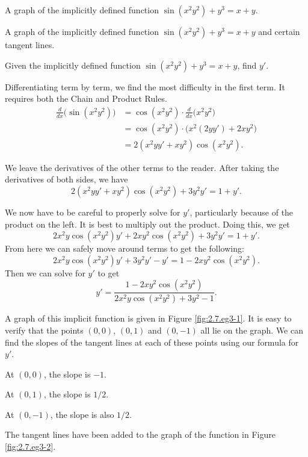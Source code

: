 \begin{marginfigure}[6cm]
\caption{A graph of the implicitly defined function $\sin(x^2y^2)+y^3=x+y$.}\label{fig:2.7.eg3-1}
\end{marginfigure}

\begin{marginfigure}
\caption{A graph of the implicitly defined function $\sin(x^2y^2)+y^3=x+y$ and certain tangent lines.}\label{fig:2.7.eg3-2}
\end{marginfigure}

\begin{example} \label{Ex:2.7.Eg3}
Given the implicitly defined function $\sin(x^2y^2)+y^3=x+y$, find $y'$.

\solution
Differentiating term by term, we find the most difficulty in the first term.  It requires both the Chain and Product Rules.
		\begin{align*}
		\frac{d}{dx}\Big(\sin(x^2y^2)\Big) &= \cos(x^2y^2)\cdot\frac{d}{dx}\Big(x^2y^2\Big) \\
																				&= \cos(x^2y^2)\cdot\big(x^2(2yy')+2xy^2\big)\\
																				&= 2(x^2yy'+xy^2)\cos(x^2y^2).
		\end{align*}  

We leave the derivatives of the other terms to the reader. After taking the derivatives of both sides, we have
$$2(x^2yy'+xy^2)\cos(x^2y^2) + 3y^2y' = 1 + y'.$$

We now have to be careful to properly solve for $y'$, particularly because of the product on the left.  It is best to multiply out the product.  Doing this, we get
$$2x^2y\cos(x^2y^2)y' + 2xy^2\cos(x^2y^2) + 3y^2y' = 1 + y'.$$
From here we can safely move around terms to get the following:
$$2x^2y\cos(x^2y^2)y' + 3y^2y' - y' = 1 - 2xy^2\cos(x^2y^2).$$
Then we can solve for $y'$ to get
$$y' = \frac{1 - 2xy^2\cos(x^2y^2)}{2x^2y\cos(x^2y^2)+3y^2-1}.$$

A graph of this implicit function is given in Figure \ref{fig:2.7.eg3-1}. It is easy to verify that the points $(0,0)$, $(0,1)$ and $(0,-1)$ all lie on the graph. We can find the slopes of the tangent lines at each of these points using our formula for $y'$. 

At $(0,0)$, the slope is $-1$.

At $(0,1)$, the slope is $1/2$.

At $(0,-1)$, the slope is also $1/2$.

The tangent lines have been added to the graph of the function in Figure \ref{fig:2.7.eg3-2}.
	
\end{example}